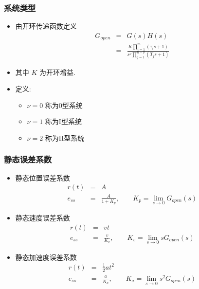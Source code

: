 \documentclass{beamer}
\begin{document}
\begin{frame}
\frametitle{系统类型}
\label{sec-2-4}

\begin{itemize}
\item <2->由开环传递函数定义
     \begin{eqnarray*}
      G_{open} & = & G(s)H(s) \\
               & = & \frac{K\prod_{i=1}^{m}(\tau_{i}s+1)}{s^{\nu}\prod_{j=1}^{n-\nu}(T_{j}s+1)}
     \end{eqnarray*}
\item <2->其中 $K$ 为开环增益.
\item <3->定义:
\begin{itemize}
\item $\nu=0$ 称为0型系统
\item $\nu=1$ 称为I型系统
\item $\nu=2$ 称为II型系统
\end{itemize}
\end{itemize}
\end{frame}
\begin{frame}
\frametitle{静态误差系数}
\label{sec-2-5}

\begin{itemize}
\item <2->静态位置误差系数
       \begin{eqnarray*}
       r(t) &=& A\\
       e_{ss}&=&\frac{A}{1+K_{p}}, \qquad
       K_{p}=\lim_{s\rightarrow 0} G_{open}(s)
       \end{eqnarray*}
\item <3->静态速度误差系数 
       \begin{eqnarray*}
       r(t)&=&vt\\
       e_{ss}&=&\frac{v}{K_{v}}, \qquad
       K_{v}=\lim_{s\rightarrow 0} sG_{open}(s)
       \end{eqnarray*}
\item <4->静态加速度误差系数 
       \begin{eqnarray*}
       r(t)&=&\frac{1}{2}at^{2}\\
       e_{ss}&=&\frac{a}{K_{a}}, \qquad
       K_{a}=\lim_{s\rightarrow 0} s^{2}G_{open}(s)
       \end{eqnarray*}
\end{itemize}
\end{frame}
\end{document}
